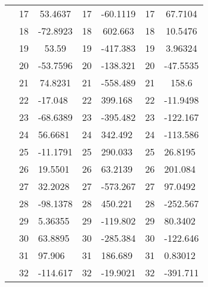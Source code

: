 \documentclass{article}
\begin{document}
\begin{longtable}[c]{ccccccc}
	& 17 & 53.4637                      & 17 & -60.1119                     & 17 & 67.7104                      \\
	& 18 & -72.8923                     & 18 & 602.663                      & 18 & 10.5476                      \\
	& 19 & 53.59                        & 19 & -417.383                     & 19 & 3.96324                      \\
	& 20 & -53.7596                     & 20 & -138.321                     & 20 & -47.5535                     \\
	\multicolumn{1}{l}{} & 21 & 74.8231                      & 21 & -558.489                     & 21 & 158.6                        \\
	\multicolumn{1}{l}{} & 22 & \multicolumn{1}{l}{-17.048}  & 22 & \multicolumn{1}{l}{399.168}  & 22 & \multicolumn{1}{l}{-11.9498} \\
	\multicolumn{1}{l}{} & 23 & \multicolumn{1}{l}{-68.6389} & 23 & \multicolumn{1}{l}{-395.482} & 23 & \multicolumn{1}{l}{-122.167} \\
	\multicolumn{1}{l}{} & 24 & \multicolumn{1}{l}{56.6681}  & 24 & \multicolumn{1}{l}{342.492}  & 24 & \multicolumn{1}{l}{-113.586} \\
	\multicolumn{1}{l}{} & 25 & \multicolumn{1}{l}{-11.1791} & 25 & \multicolumn{1}{l}{290.033}  & 25 & \multicolumn{1}{l}{26.8195}  \\
	\multicolumn{1}{l}{} & 26 & \multicolumn{1}{l}{19.5501}  & 26 & \multicolumn{1}{l}{63.2139}  & 26 & \multicolumn{1}{l}{201.084}  \\
	\multicolumn{1}{l}{} & 27 & \multicolumn{1}{l}{32.2028}  & 27 & \multicolumn{1}{l}{-573.267} & 27 & \multicolumn{1}{l}{97.0492}  \\
	\multicolumn{1}{l}{} & 28 & \multicolumn{1}{l}{-98.1378} & 28 & \multicolumn{1}{l}{450.221}  & 28 & \multicolumn{1}{l}{-252.567} \\
	\multicolumn{1}{l}{} & 29 & \multicolumn{1}{l}{5.36355}  & 29 & \multicolumn{1}{l}{-119.802} & 29 & \multicolumn{1}{l}{80.3402}  \\
	\multicolumn{1}{l}{} & 30 & \multicolumn{1}{l}{63.8895}  & 30 & \multicolumn{1}{l}{-285.384} & 30 & \multicolumn{1}{l}{-122.646} \\
	\multicolumn{1}{l}{} & 31 & \multicolumn{1}{l}{97.906}   & 31 & \multicolumn{1}{l}{186.689}  & 31 & \multicolumn{1}{l}{0.83012}  \\
	\multicolumn{1}{l}{} & 32 & \multicolumn{1}{l}{-114.617} & 32 & \multicolumn{1}{l}{-19.9021} & 32 & \multicolumn{1}{l}{-391.711} \\

\end{longtable}
\end{document}
